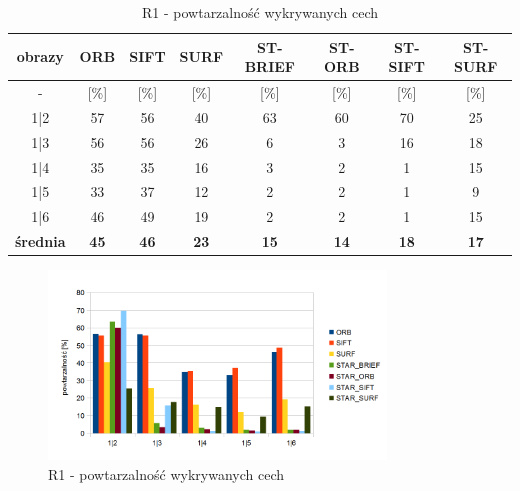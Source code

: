 \begin{table}[htbp]
  \centering
  \caption{R1 - powtarzalność wykrywanych cech}
    \begin{tabular}{|c|c|c|c|c|c|c|c|}\hline

    obrazy & \textbf{ORB} & \textbf{SIFT} & \textbf{SURF} & \textbf{ST-BRIEF} & \textbf{ST-ORB} & \textbf{ST-SIFT} & \textbf{ST-SURF} \\\hline

    -  & [\%] & [\%] & [\%] & [\%] & [\%] & [\%] & [\%] \\\hline
    1|2 & 57 & 56 & 40 & 63 & 60 & 70 & 25 \\
    1|3 & 56 & 56 & 26 & 6 & 3 & 16 & 18 \\
    1|4 & 35 & 35 & 16 & 3 & 2 & 1 & 15 \\
    1|5 & 33 & 37 & 12 & 2 & 2 & 1 & 9 \\
    1|6 & 46 & 49 & 19 & 2 & 2 & 1 & 15 \\\hline
    \textbf{średnia} & \textbf{45} & \textbf{46} & \textbf{23} & \textbf{15} & \textbf{14} & \textbf{18} & \textbf{17} \\\hline
   
    \end{tabular}%
  \label{tab:r1_m1}%
\end{table}%


\begin{figure}[!htbp]
\centering
\includegraphics[width=0.8\textwidth]{pict/slowik/r1/m1.png}
\caption{R1 - powtarzalność wykrywanych cech}
\label{fig:r1_m1}
\end{figure}


